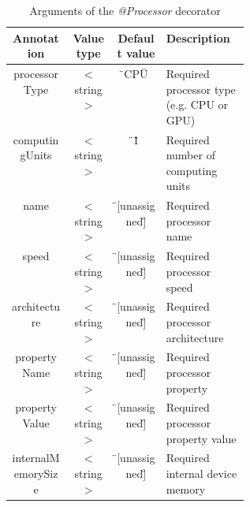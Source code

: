 \bgroup
  \def\arraystretch{1.4}%
  \begin{table}[!ht]
  \centering
  \begin{tabular}{ | c | c | c | p{0.35\linewidth} | }
  \hline
  \textbf{Annotation} 	& \textbf{Value type}	& \textbf{Default value}& \textbf{Description} \\ \hline
  processorType		& $<$string$>$ 		& \"{}CPU\"	 	& Required processor type (e.g. CPU or GPU)\\ \hline
  computingUnits 	& $<$string$>$ 		& \"{}1\" 		& Required number of computing units \\ \hline
  name 			& $<$string$>$ 		& \"{}[unassigned]\" 	& Required processor name \\ \hline
  speed 		& $<$string$>$ 		& \"{}[unassigned]\" 	& Required processor speed \\ \hline
  architecture 		& $<$string$>$ 		& \"{}[unassigned]\" 	& Required processor architecture \\ \hline
  propertyName		& $<$string$>$ 		& \"{}[unassigned]\" 	& Required processor property \\ \hline
  propertyValue		& $<$string$>$ 		& \"{}[unassigned]\" 	& Required processor property value \\ \hline
  internalMemorySize 	& $<$string$>$ 		& \"{}[unassigned]\" 	& Required internal device memory \\ \hline
  \end{tabular}
  \caption{Arguments of the \textit{@Processor} decorator}
  \label{tab:processor_constraint}
  \end{table}
\egroup